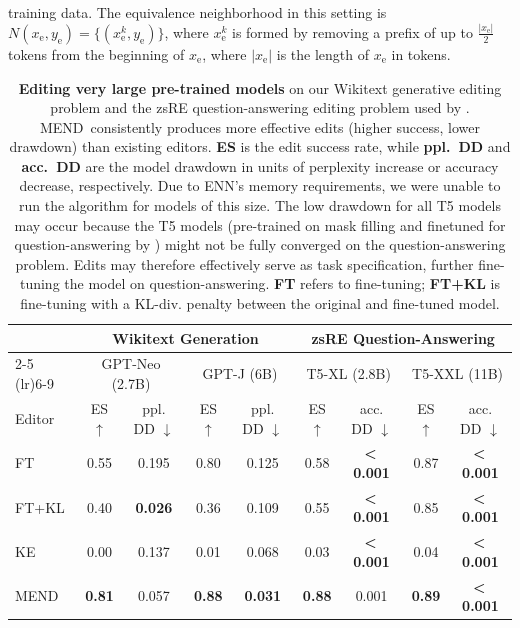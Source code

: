 \documentclass{article}
\newcommand{\name}{MEND}
\newcommand{\xe}{x_\text{e}}
\newcommand{\ye}{y_\text{e}}
\newcommand{\neighborhood}{N(\xe,\ye)}
\newcommand{\rebuttal}[1]{#1}
\newcommand{\textlt}[1]{\textless\,#1\phantom{\textless\,}}
\begin{document}
training data. The equivalence neighborhood in this setting is $\neighborhood = \{(\xe^k,\ye)\}$, where ${\xe^k}$ is formed by removing a prefix of up to $\frac{|\xe|}{2}$ tokens from the beginning of $\xe$, where $|\xe|$ is the length of $\xe$ in tokens.


\begin{table}
    \centering
    \small
    \begin{tabular}{lcccccccc}
    \toprule
       & \multicolumn{4}{c}{\textbf{Wikitext Generation}} & \multicolumn{4}{c}{\textbf{zsRE Question-Answering}} \\ 
       \cmidrule(lr){2-5} \cmidrule(lr){6-9}
       & \multicolumn{2}{c}{GPT-Neo (2.7B)} & \multicolumn{2}{c}{GPT-J (6B)} & \multicolumn{2}{c}{T5-XL (2.8B)} & \multicolumn{2}{c}{T5-XXL (11B)} \\
       \midrule
       Editor & ES $\uparrow$ & ppl. DD $\downarrow$ & ES $\uparrow$ & ppl. DD $\downarrow$ & ES $\uparrow$ & acc. DD $\downarrow$ & ES $\uparrow$ & acc. DD $\downarrow$ \\
       \midrule
       FT & 0.55 & 0.195 & 0.80 & 0.125 & 0.58 & \textbf{\textlt{0.001}} & 0.87 & \textbf{\textlt{0.001}} \\
       FT+KL & 0.40 & \textbf{0.026} & 0.36 & 0.109 & 0.55 & \textbf{\textlt{0.001}} & 0.85 & \textbf{\textlt{0.001}} \\
       KE & 0.00 & 0.137 & 0.01 & 0.068 & 0.03 & \textbf{\textlt{0.001}} & 0.04 & \textbf{\textlt{0.001}} \\
       \name & \textbf{0.81} & 0.057 & \textbf{0.88} & \textbf{0.031} & \textbf{0.88} & 0.001 & \textbf{0.89} & \textbf{\textlt{0.001}} \\
     \bottomrule
    \end{tabular}
    \caption{\textbf{Editing very large pre-trained models} on our Wikitext generative editing problem and the zsRE question-answering editing problem used by \citet{Cao2021EditingFK}. \name~consistently produces more effective edits (higher success, lower drawdown) than existing editors. \textbf{ES} is the edit success rate, while \textbf{ppl.\ DD} and \textbf{acc.\ DD} are the model drawdown in units of perplexity increase or accuracy decrease, respectively. Due to ENN's memory requirements, we were unable to run the algorithm for models of this size. The low drawdown for all T5 models may occur because the T5 models (pre-trained on mask filling and finetuned for question-answering by \citet{roberts2020knowledge}) might not be fully converged on the question-answering problem. Edits may therefore effectively serve as task specification, further fine-tuning the model on question-answering. \rebuttal{\textbf{FT} refers to fine-tuning; \textbf{FT+KL} is fine-tuning with a KL-div. penalty between the original and fine-tuned model.}}
    \label{tab:large-model-results}
\end{table}
\end{document}
